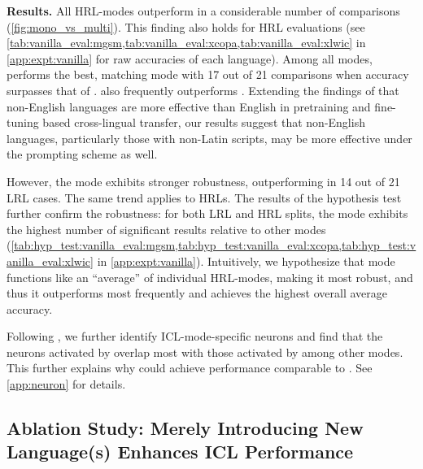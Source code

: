 \vspace{2pt}\noindent\textbf{Results.} \label{sec:mono_vs_multilingual_results}
All HRL-\monolingual modes outperform \english in a considerable number of comparisons (\cref{fig:mono_vs_multi}).
This finding also holds for HRL evaluations (see \cref{tab:vanilla_eval:mgsm,tab:vanilla_eval:xcopa,tab:vanilla_eval:xlwic} in \cref{app:expt:vanilla} for raw accuracies of each language). Among all \monolingual modes, \chinese performs the best, matching \multilingual mode with 17 out of 21 comparisons when accuracy surpasses that of \english.
\japanese also frequently outperforms \english.
Extending the findings of \citet{revisit_primacy_of_english} that non-English languages are more effective than English in pretraining and fine-tuning based cross-lingual transfer, our results suggest that non-English languages, particularly those with non-Latin scripts, may be more effective under the prompting scheme as well.

However, the \multilingual mode exhibits stronger robustness, outperforming \chinese in 14 out of 21 LRL cases.
The same trend applies to HRLs.
The results of the hypothesis test further confirm the robustness: for both LRL and HRL splits, the \multilingual mode exhibits the highest number of significant results relative to other \monolingual modes (\cref{tab:hyp_test:vanilla_eval:mgsm,tab:hyp_test:vanilla_eval:xcopa,tab:hyp_test:vanilla_eval:xlwic} in \cref{app:expt:vanilla}).
Intuitively, we hypothesize that \multilingual mode functions like an ``average'' of individual HRL-\monolingual modes, making it most robust, and thus it outperforms \english most frequently and achieves the highest overall average accuracy. 

Following \citet{language_specific_neuron_msra}, we further identify ICL-mode-specific neurons and find that the neurons activated by \multilingual overlap most with those activated by \native among other modes. This further explains why \multilingual could achieve performance comparable to \native. See \cref{app:neuron} for details.




\subsection{Ablation Study: Merely Introducing New Language(s) Enhances ICL Performance} \label{sec:icl_mode_eval:cis}

